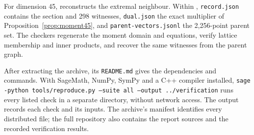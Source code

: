 For dimension 45,  reconstructs the extremal neighbour.
Within , \texttt{record.json} contains the section
and 298 witnesses, \texttt{dual.json} the exact multiplier of
Proposition~\ref{prop:moment45}, and \texttt{parent-vectors.jsonl} the
2,256-point parent set. The checkers regenerate the moment domain and
equations, verify lattice membership and inner products, and recover
the same witnesses from the parent graph.

After extracting the archive, its \texttt{README.md} gives the dependencies
and commands. With SageMath, NumPy, SymPy and a C++ compiler installed,
\texttt{sage -python tools/reproduce.py --suite all --output ../verification}
runs every listed check in a separate directory, without network access.
The output records each check and its inputs. The archive's manifest
identifies every distributed file; the full repository also contains
the report sources and the recorded verification results.
